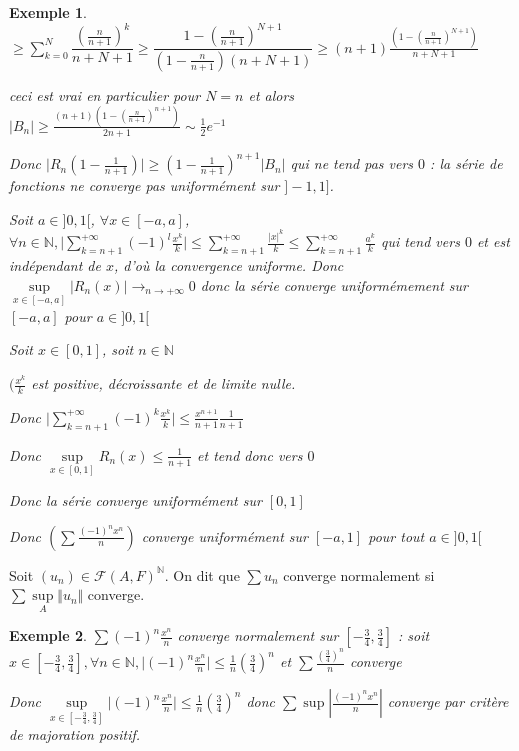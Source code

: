 \documentclass[a4paper,12pt]{book}
\newcommand{\Def}[2]{\begin{tcolorbox}[sharp corners, colback=white,colframe=blue!90!black!75, title=Définition : #1]#2\end{tcolorbox}}
\newtheorem{Exe}{Exemple}[section]
\def\N{\mathbb{N}}
\begin{document}
\begin{Exe}
\par $\geq \sum\limits_{k=0}^N\dfrac{(\frac{n}{n+1})^k}{n+N+1}\geq \dfrac{1-(\frac{n}{n+1})^{N+1}}{(1-\frac{n}{n+1})(n+N+1)}\geq (n+1)\frac{(1-(\frac{n}{n+1})^{N+1})}{n+N+1}$ \par ceci est vrai en particulier pour $N=n$ et alors $\vert B_n\vert\geq \frac{(n+1)(1-(\frac{n}{n+1})^{n+1})}{2n+1}\sim \frac{1}{2}e^{-1}$
\par Donc $\vert R_n(1-\frac{1}{n+1})\vert\geq (1-\frac{1}{n+1})^{n+1}\vert B_n\vert$ qui ne tend pas vers $0$ : la série de fonctions ne converge pas uniformément sur $]-1,1]$.
\par Soit $a\in]0,1[$, $\forall x\in [-a,a]$, $\forall n\in\N, \vert\sum\limits_{k=n+1}^{+\infty}(-1)^l\frac{x^k}{k}\vert\leq \sum\limits_{k=n+1}^{+\infty}\frac{\vert x\vert^k}{k}\leq \sum\limits_{k=n+1}^{+\infty}\frac{a^k}{k}$ qui tend vers $0$ et est indépendant de $x$, d'où la convergence uniforme. Donc $\sup\limits_{x\in [-a,a]}\vert R_n(x)\vert\to_{n\to+\infty} 0$ donc la série converge uniformémement sur $[-a,a]$ pour $a\in]0,1[$
\par Soit $x\in[0,1]$, soit $n\in\N$ \par $(\frac{x^k}{k}$ est positive, décroissante et de limite nulle. \par Donc $\vert\sum\limits_{k=n+1}^{+\infty}(-1)^k\frac{x^k}{k}\vert\leq \frac{x^{n+1}}{n+1}\frac{1}{n+1}$ \par Donc $\sup\limits_{x\in[0,1]}R_n(x)\leq \frac{1}{n+1}$ et tend donc vers $0$ \par Donc la série converge uniformément sur $[0,1]$ \par Donc $\left(\sum\frac{(-1)^nx^n}{n}\right)$ converge uniformément sur $[-a,1]$ pour tout $a\in]0,1[$
\end{Exe}
\Def{Convergence normale}{Soit $(u_n)\in\mathcal{F}(A,F)^\N$. On dit que $\sum u_n$ converge normalement si $\sum \sup\limits_A \Vert u_n\Vert$ converge.}
\begin{Exe}
$\sum(-1)^n\frac{x^n}{n}$ converge normalement sur $\left[-\frac{3}{4}, \frac{3}{4}\right]$ : soit $x\in\left[-\frac{3}{4},\frac{3}{4}\right],\forall n\in\N, \vert (-1)^n\frac{x^n}{n}\vert\leq \frac{1}{n}\left(\frac{3}{4}\right)^n$ et $\sum \frac{\left(\frac{3}{4}\right)^n}{n}$ converge \par Donc $\sup\limits_{x\in\left[-\frac{3}{4},\frac{3}{4}\right]}\vert(-1)^n\frac{x^n}{n}\vert\leq \frac{1}{n}\left(\frac{3}{4}\right)^n$ donc $\sum\sup\left|\frac{(-1)^nx^n}{n}\right|$ converge par critère de majoration positif.
\end{Exe}
\end{document}
